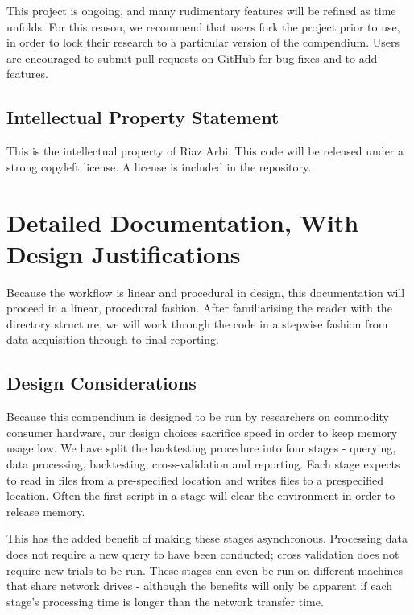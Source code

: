 \documentclass[11pt,preprint, authoryear]{elsarticle}
\numberwithin{equation}{section}
\numberwithin{figure}{section}
\numberwithin{table}{section}
\begin{document}
This project is ongoing, and many rudimentary features will be refined
as time unfolds. For this reason, we recommend that users fork the
project prior to use, in order to lock their research to a particular
version of the compendium. Users are encouraged to submit pull requests
on \href{https://github.com}{GitHub} for bug fixes and to add features.

\subsection{Intellectual Property
Statement}\label{intellectual-property-statement}

This is the intellectual property of Riaz Arbi. This code will be
released under a strong copyleft license. A license is included in the
repository.

\newpage

\section{Detailed Documentation, With Design
Justifications}\label{detailed-documentation-with-design-justifications}

Because the workflow is linear and procedural in design, this
documentation will proceed in a linear, procedural fashion. After
familiarising the reader with the directory structure, we will work
through the code in a stepwise fashion from data acquisition through to
final reporting.

\subsection{Design Considerations}\label{design-considerations}

Because this compendium is designed to be run by researchers on
commodity consumer hardware, our design choices sacrifice speed in order
to keep memory usage low. We have split the backtesting procedure into
four stages - querying, data processing, backtesting, cross-validation
and reporting. Each stage expects to read in files from a pre-specified
location and writes files to a prespecified location. Often the first
script in a stage will clear the environment in order to release memory.

This has the added benefit of making these stages asynchronous.
Processing data does not require a new query to have been conducted;
cross validation does not require new trials to be run. These stages can
even be run on different machines that share network drives - although
the benefits will only be apparent if each stage's processing time is
longer than the network transfer time.
\end{document}
